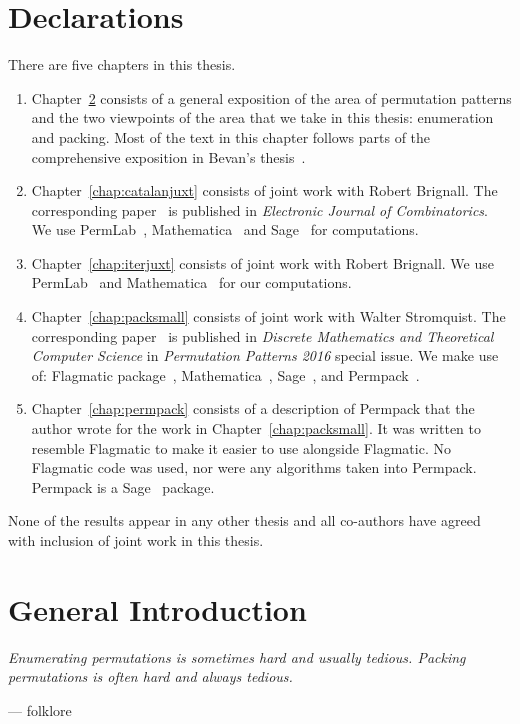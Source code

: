 \documentclass[12pt, a4paper, twoside]{report}
\begin{document}
\chapter{Declarations}
There are five chapters in this thesis.
\begin{enumerate}
\item Chapter~\ref{chap:general_intro} consists of a general exposition of the area of permutation patterns and the two viewpoints of the area that we take in this thesis: enumeration and packing. Most of the text in this chapter follows parts of the comprehensive exposition in Bevan's thesis~\cite{bevan2015thesis}.
\item Chapter~\ref{chap:catalanjuxt} consists of joint work with Robert Brignall. The corresponding paper~\cite{brignallsliacanjuxt} is published in \emph{Electronic Journal of Combinatorics}. We use PermLab~\cite{albertpermlab}, Mathematica~\cite{mathematica} and Sage~\cite{sagemath} for computations.
\item Chapter~\ref{chap:iterjuxt} consists of joint work with Robert Brignall. We use PermLab~\cite{albertpermlab} and Mathematica~\cite{mathematica} for our computations.
\item Chapter~\ref{chap:packsmall} consists of joint work with Walter Stromquist. The corresponding paper~\cite{sliacanstromquistpacking} is published in \emph{Discrete Mathematics and Theoretical Computer Science} in \emph{Permutation Patterns 2016} special issue. We make use of: Flagmatic package~\cite{flagmatic}, Mathematica~\cite{mathematica}, Sage~\cite{sagemath}, and Permpack~\cite{permpack}.
\item Chapter~\ref{chap:permpack} consists of a description of Permpack that the author wrote for the work in Chapter~\ref{chap:packsmall}. It was written to resemble Flagmatic to make it easier to use alongside Flagmatic. No Flagmatic code was used, nor were any algorithms taken into Permpack. Permpack is a Sage~\cite{sagemath} package.
\end{enumerate}
None of the results appear in any other thesis and all co-authors have agreed with inclusion of joint work in this thesis.
\afterpage{\null\newpage}


\setlength{\parskip}{0em}
\setcounter{secnumdepth}{3}
\tableofcontents
\setlength{\parskip}{1em}
\chapter{General Introduction}
\label{chap:general_intro}
%
\begin{center}
\emph{Enumerating permutations is sometimes hard and usually tedious. Packing permutations is often hard and always tedious.}
\end{center}
\begin{flushright}
  \vspace{-15pt}
  --- folklore
  \vspace{20pt}
\end{flushright}
\end{document}
